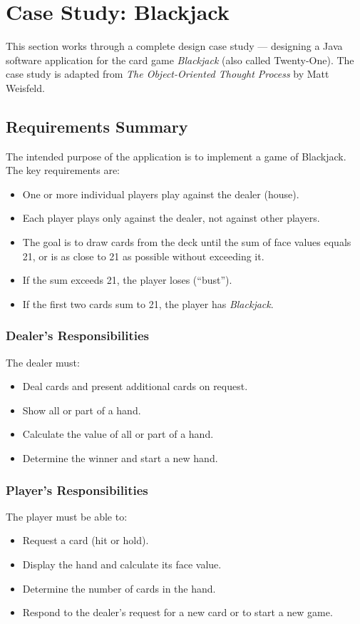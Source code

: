 \documentclass[11pt, a4paper, notitlepage]{report}
\theoremstyle{definition}
\theoremstyle{remark}
\theoremstyle{definition}
\begin{document}
\section{Case Study: Blackjack}
\label{sec:ch8-blackjack}

This section works through a complete design case study --- designing a Java software
application for the card game \emph{Blackjack} (also called Twenty-One). The case study
is adapted from \emph{The Object-Oriented Thought Process} by Matt Weisfeld.

\subsection{Requirements Summary}

The intended purpose of the application is to implement a game of Blackjack.
The key requirements are:

\begin{itemize}
  \item One or more individual players play against the dealer (house).
  \item Each player plays only against the dealer, not against other players.
  \item The goal is to draw cards from the deck until the sum of face values equals
        21, or is as close to 21 as possible without exceeding it.
  \item If the sum exceeds 21, the player loses (``bust'').
  \item If the first two cards sum to 21, the player has \emph{Blackjack}.
\end{itemize}

\subsubsection{Dealer's Responsibilities}
The dealer must:
\begin{itemize}
  \item Deal cards and present additional cards on request.
  \item Show all or part of a hand.
  \item Calculate the value of all or part of a hand.
  \item Determine the winner and start a new hand.
\end{itemize}

\subsubsection{Player's Responsibilities}
The player must be able to:
\begin{itemize}
  \item Request a card (hit or hold).
  \item Display the hand and calculate its face value.
  \item Determine the number of cards in the hand.
  \item Respond to the dealer's request for a new card or to start a new game.
\end{itemize}
\end{document}
